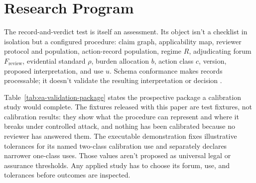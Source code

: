 \section{Research Program}

The record-and-verdict test is itself an assessment. Its object isn't a checklist in isolation but a configured procedure: claim graph, applicability map, reviewer protocol and population, action-record population, regime \(R\), adjudicating forum \(F_{\mathrm{review}}\), evidential standard \(\rho\), burden allocation \(b\), action class \(c\), version, proposed interpretation, and use \(u\). Schema conformance makes records processable; it doesn't validate the resulting interpretation or decision \citep{messick1995Validity}.

Table~\ref{tab:ea-validation-package} states the prospective package a calibration study would complete. The fixtures released with this paper are test fixtures, not calibration results: they show what the procedure can represent and where it breaks under controlled attack, and nothing has been calibrated because no reviewer has answered them. The executable demonstration fixes illustrative tolerances for its named two-class calibration use and separately declares narrower one-class uses. Those values aren't proposed as universal legal or assurance thresholds. Any applied study has to choose its forum, use, and tolerances before outcomes are inspected.

